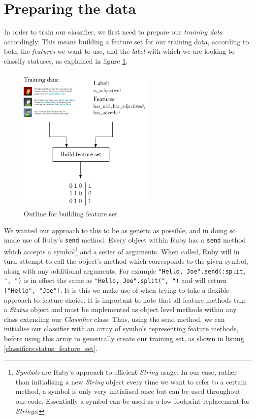 \section{Preparing the data}
\label{classifiers:preparing_data}

In order to train our classifier, we first need to prepare our \emph{training data} accordingly. This means building a feature set for our training data, according to both the \emph{features} we want to use, and the \emph{label} with which we are looking to classify statuses, as explained in figure \ref{fig:building_feature_set}.

\begin{figure}[h!]
	\caption{Outline for building feature set}
	\label{fig:building_feature_set}
	\centering
		\includegraphics[width=0.6\textwidth]{figures/build_training_data.pdf}
\end{figure}

We wanted our approach to this to be as generic as possible, and in doing so made use of Ruby's \texttt{send} method. Every object within Ruby has a \texttt{send} method which accepts a symbol\footnote{\emph{Symbols} are Ruby's approach to efficient \emph{String} usage. In our case, rather than initialising a new \emph{String} object every time we want to refer to a certain method, a symbol is only very initialised once but can be used throughout our code. Essentially a symbol can be used as a low footprint replacement for \emph{Strings}.} and a series of arguments. When called, Ruby will in turn attempt to call the object's method which corresponds to the given symbol, along with any additional arguments. For example \texttt{"Hello, Joe".send(:split, ", ")} is in effect the same as \texttt{"Hello, Joe".split(", ")} and will return \texttt{["Hello", "Joe"]}. It is this we make use of when trying to take a flexible approach to feature choice. It is important to note that all feature methods take a \emph{Status} object and must be implemented as object level methods within any class extending our \emph{Classifier} class. Thus, using the send method, we can initialise our classifier with an array of symbols representing feature methods, before using this array to generically create our training set, as shown in listing \ref{classifiers:status_feature_set}.

